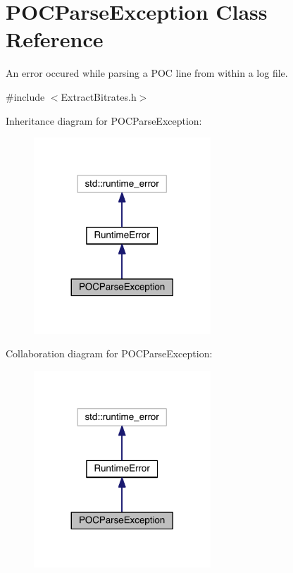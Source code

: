 \hypertarget{class_p_o_c_parse_exception}{}\section{P\+O\+C\+Parse\+Exception Class Reference}
\label{class_p_o_c_parse_exception}


An error occured while parsing a P\+OC line from within a log file.  




{\ttfamily \#include $<$Extract\+Bitrates.\+h$>$}



Inheritance diagram for P\+O\+C\+Parse\+Exception\+:
\nopagebreak
\begin{figure}[H]
\begin{center}
\leavevmode
\includegraphics[width=188pt]{d7/d70/class_p_o_c_parse_exception__inherit__graph}
\end{center}
\end{figure}


Collaboration diagram for P\+O\+C\+Parse\+Exception\+:
\nopagebreak
\begin{figure}[H]
\begin{center}
\leavevmode
\includegraphics[width=188pt]{d6/dab/class_p_o_c_parse_exception__coll__graph}
\end{center}
\end{figure}
